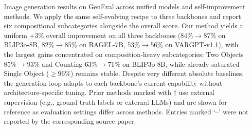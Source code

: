 \begin{table}[t]
  \caption{Image generation results on GenEval across unified models and self-improvement methods. We apply the same self-evolving recipe to three backbones and report six compositional subcategories alongside the overall score. Our method yields a uniform +3\% overall improvement on all three backbones (84\%$\to$87\% on BLIP3o-8B, 82\%$\to$85\% on BAGEL-7B, 53\%$\to$56\% on VARGPT-v1.1), with the largest gains concentrated on composition-heavy subcategories: Two Objects 85\%$\to$93\% and Counting 63\%$\to$71\% on BLIP3o-8B, while already-saturated Single Object (${\geq}96\%$) remains stable. Despite very different absolute baselines, the generation loop adapts to each backbone's current capability without architecture-specific tuning. Prior methods marked with $\dagger$ use external supervision (e.g., ground-truth labels or external LLMs) and are shown for reference as evaluation settings differ across methods. Entries marked `--' were not reported by the corresponding source paper.}
  \label{tab:generation_results}
  \centering
  \small


\end{table}
